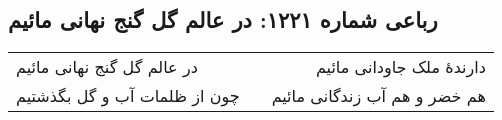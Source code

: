 \begin{center}
\section*{رباعی شماره ۱۲۲۱: در عالم گل گنج نهانی مائیم}
\label{sec:1221}
\begin{longtable}{l p{0.5cm} r}
در عالم گل گنج نهانی مائیم
&&
دارندهٔ ملک جاودانی مائیم
\\
چون از ظلمات آب و گل بگذشتیم
&&
هم خضر و هم آب زندگانی مائیم
\\
\end{longtable}
\end{center}
